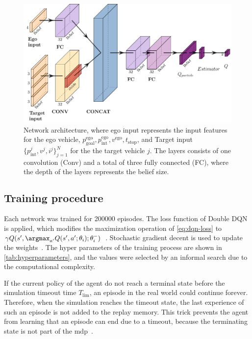 \begin{figure}[!t]
    \centering
        \includegraphics[width=0.9\columnwidth]{figures/belief.pdf}
        \caption{Network architecture, where ego input represents the input features for the ego vehicle, $p^\mathrm{ego}_\mathrm{goal},p^\mathrm{ego}_\mathrm{int}, v^\mathrm{ego}, t_\mathrm{stop}$, and Target input $\{p^{j}_\mathrm{int}, v^j, i^j\}_{j=1}^N$ for the the target vehicle $j$. The layers consists of one convolution (Conv) and a total of three fully connected (FC), where the depth of the layers represents the belief size.}
    \label{fig:network}
\end{figure}

\subsection{Training procedure}
\label{sec:training_procedure}
Each network was trained for \num{200000} episodes. The loss function of Double DQN is applied, which modifies the maximization operation of \ref{eq:dqn-loss} to $\gamma Q(s',\argmax_{a'} Q(s',a';\theta_i);\theta_i^-)$~\cite{Hasselt2016}. 
Stochastic gradient decent is used to update the weights~\cite{Kingma2014}. The hyper parameters of the training process are shown in \ref{tab:hyperparameters}, and the values were selected by an informal search due to the computational complexity. 

If the current policy of the agent do not reach a terminal state before the simulation timeout time $T_\mathrm{lim}$, an episode in the real world could continue forever. Therefore, when the simulation reaches the timeout state, the last experience of such an episode is not added to the replay memory. This trick prevents the agent from learning that an episode can end due to a timeout, because the terminating state is not part of the \gls{mdp}~\cite{Hoel2018}.

